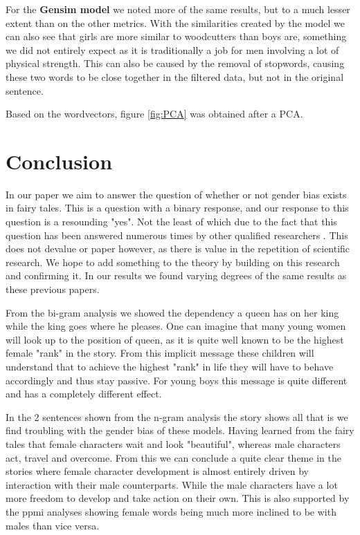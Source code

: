 \documentclass[11pt]{article}
\begin{document}
For the \textbf{Gensim model} we noted more of the same results, but to a much lesser extent than on the other metrics. With the similarities created by the model we can also see that girls are more similar to woodcutters than boys are, something we did not entirely expect as it is traditionally a job for men involving a lot of physical strength. This can also be caused by the removal of stopwords, causing these two words to be close together in the filtered data, but not in the original sentence. \par
Based on the wordvectors, figure \ref{fig:PCA} was obtained after a PCA. 

\section{Conclusion}

In our paper we aim to answer the question of whether or not gender bias exists in fairy tales. This is a question with a binary response, and our response to this question is a resounding "yes". Not the least of which due to the fact that this question has been answered numerous times by other qualified researchers \cite{Baker} \cite{Lieberman} \cite{Weingart}. This does not devalue or paper however, as there is value in the repetition of scientific research. We hope to add something to the theory by building on this research and confirming it. In our results we found varying degrees of the same results as these previous papers. 

From the bi-gram analysis we showed the dependency a queen has on her king while the king goes where he pleases. One can imagine that many young women will look up to the position of queen, as it is quite well known to be the highest female "rank" in the story. From this implicit message these children will understand that to achieve the highest "rank" in life they will have to behave accordingly and thus stay passive. For young boys this message is quite different and has a completely different effect. 

In the 2 sentences shown from the n-gram analysis the story shows all that is we find troubling with the gender bias of these models. Having learned from the fairy tales that female characters wait and look "beautiful", whereas male characters act, travel and overcome. From this we can conclude a quite clear theme in the stories where female character development is almost entirely driven by interaction with their male counterparts. While the male characters have a lot more freedom to develop and take action on their own. This is also supported by the ppmi analyses showing female words being much more inclined to be with males than vice versa. 
\end{document}
